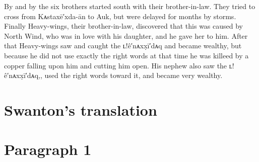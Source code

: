 By and by the six brothers started south with their brother-in-law.
They tried to cross from Kᴀstaxē′xda-ān to Auk, but were delayed for months by storms.
Finally Heavy-wings, their brother-in-law, discovered that this was caused by North Wind, who was in love with his daughter, and he gave her to him.
After that Heavy-wings saw and caught the ʟ!ê′nᴀxx̣ī′dᴀq and became wealthy, but because he did not use exactly the right words at that time he was killeed by a copper falling upon him and cutting him open.
His nephew also saw the ʟ!ê′nᴀxx̣ī′dᴀq,, used the right words toward it, and became very wealthy.

\section{Swanton’s translation}\label{sec:105-swanton-translation}

\section{Paragraph 1}\label{sec:105-para-1}

